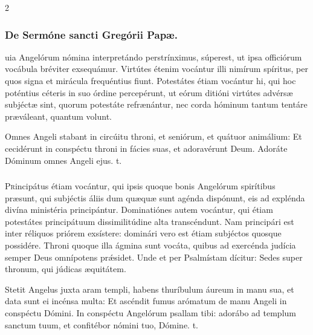 \documentclass[9pt,twoside]{extarticle}
\begin{document}
\begin{multicols}{2}
\subsubsection*{\center De Sermóne sancti Gregórii Papæ.}
\begin{center}\end{center}
uia Angelórum nómina interpretándo perstrínximus, súperest, ut ipsa officiórum vocábula bréviter exsequámur. Virtútes étenim vocántur illi nimírum spíritus, per quos signa et mirácula frequéntius fiunt. Potestátes étiam vocántur hi, qui hoc poténtius céteris in suo órdine percepérunt, ut eórum ditióni virtútes advérsæ subjéctæ sint, quorum potestáte refrænántur, nec corda hóminum tantum tentáre præváleant, quantum volunt.

\begin{tightlist}{}
\item {} Omnes Angeli stabant in circúitu throni, et seniórum, et quátuor animálium: \textred{*} Et cecidérunt in conspéctu throni in fácies suas, et adoravérunt Deum.  Adoráte Dóminum omnes Angeli ejus. t.
\end{tightlist}

\subsubsection*{\center {}}
\lettrine{P}rincipátus étiam vocántur, qui ipsis quoque bonis Angelórum spirítibus præsunt, qui subjéctis áliis dum quæquæ sunt agénda dispónunt, eis ad explénda divína ministéria principántur. Dominatiónes autem vocántur, qui étiam potestátes principátuum dissimilitúdine alta transcéndunt. Nam principári est inter réliquos priórem exsístere: dominári vero est étiam subjéctos quosque possidére. Throni quoque illa ágmina sunt vocáta, quibus ad exercénda judícia semper Deus omnípotens prǽsidet. Unde et per Psalmístam dícitur: Sedes super thronum, qui júdicas æquitátem.

\begin{tightlist}{}
\item {} Stetit Angelus juxta aram templi, habens thuríbulum áureum in manu sua, et data sunt ei incénsa multa: \textred{*} Et ascéndit fumus arómatum de manu Angeli in conspéctu Dómini.  In conspéctu Angelórum psallam tibi: adorábo ad templum sanctum tuum, et confitébor nómini tuo, Dómine. t.
\end{tightlist}


\end{multicols}
\end{document}
